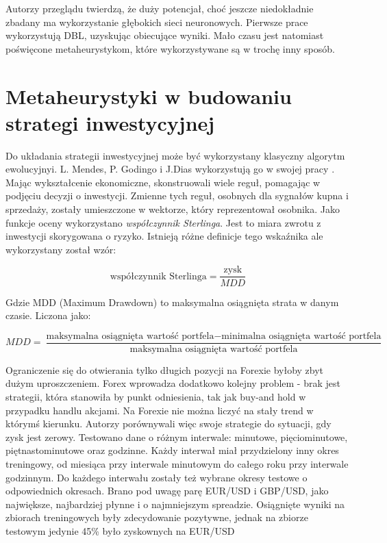 \documentclass[twoside]{iisthesis}
\begin{document}
Autorzy przeglądu \cite{Cavalcante2016194} twierdzą, że duży potencjał, choć jeszcze niedokładnie zbadany ma wykorzystanie głębokich sieci neuronowych. Pierwsze prace wykorzystują DBL, uzyskując obiecujące wyniki. Mało czasu jest natomiast poświęcone metaheurystykom, które wykorzystywane są w trochę inny sposób.





\section{Metaheurystyki w budowaniu strategi inwestycyjnej}

Do układania strategii inwestycyjnej może być wykorzystany klasyczny algorytm ewolucyjnyi. L. Mendes, P. Godingo i J.Dias wykorzystują go w swojej pracy \cite{Mendes2012}. Mając wykształcenie ekonomiczne, skonstruowali wiele reguł, pomagając w podjęciu decyzji o inwestycji. Zmienne tych reguł, osobnych dla sygnałów kupna i sprzedaży, zostały umieszczone w wektorze, który reprezentował osobnika. Jako funkcje oceny wykorzystano \textit{współczynnik Sterlinga}. Jest to miara zwrotu z inwestycji skorygowana o ryzyko. Istnieją różne definicje tego wskaźnika ale wykorzystany został wzór:

\[\text{współczynnik Sterlinga}=\frac{\text{zysk}}{MDD}\]

Gdzie MDD (Maximum Drawdown) to maksymalna osiągnięta strata w danym czasie. Liczona jako:

\[MDD=\frac{\text{maksymalna osiągnięta wartość portfela} - \text{minimalna osiągnięta wartość portfela}}{\text{maksymalna osiągnięta wartość portfela}}\]

Ograniczenie się do otwierania tylko długich pozycji na Forexie byłoby zbyt dużym uproszczeniem. Forex wprowadza dodatkowo kolejny problem - brak jest strategii, która stanowiła by punkt odniesienia, tak jak buy-and hold w przypadku handlu akcjami. Na Forexie nie można liczyć na stały trend w którymś kierunku. Autorzy porównywali więc swoje strategie do sytuacji, gdy zysk jest zerowy. Testowano dane o różnym interwale: minutowe, pięciominutowe, piętnastominutowe oraz godzinne. Każdy interwał miał przydzielony inny okres treningowy, od miesiąca przy interwale minutowym do całego roku przy interwale godzinnym. Do każdego interwału zostały też wybrane okresy testowe o odpowiednich okresach. Brano pod uwagę parę EUR/USD i GBP/USD, jako największe, najbardziej płynne i o najmniejszym spreadzie. Osiągnięte wyniki na zbiorach treningowych były zdecydowanie pozytywne, jednak na zbiorze testowym jedynie 45\% było zyskownych na EUR/USD
\end{document}
